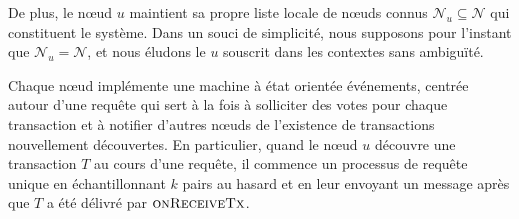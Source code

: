 De plus, le nœud $u$ maintient sa propre liste locale de nœuds connus $\mathcal{N}_u \subseteq \mathcal{N}$ qui constituent le système.
Dans un souci de simplicité, nous supposons pour l'instant que $\mathcal{N}_u = \mathcal{N}$, et nous éludons le $u$ souscrit dans les contextes sans ambiguïté.
%

Chaque nœud implémente une machine à état orientée événements, centrée autour d'une requête qui sert à la fois à solliciter des votes pour chaque transaction et à notifier d'autres nœuds de l'existence de transactions nouvellement découvertes.
En particulier, quand le nœud $u$ découvre une transaction $T$ au cours d'une requête, il commence un processus de requête unique %
en échantillonnant $k$ pairs au hasard et en leur envoyant un message après que $T$ a été délivré par $\textsc{onReceiveTx}$.

